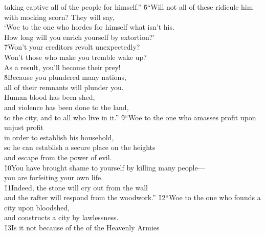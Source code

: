 \begin{poetry}
\poemll    taking captive all of the people for himself.''
\poeml \v{6}``Will not all of these ridicule him \\
\poemll    with mocking scorn? They will say, \\
\poeml `Woe to the one who hordes for himself what isn't his. \\
\poemll    How long will you enrich yourself by extortion?' \\
\poeml \v{7}Won't your creditors revolt unexpectedly? \\
\poemll    Won't those who make you tremble wake up? \\
\poemlll       As a result, you'll become their prey! \\
\poeml \v{8}Because you plundered many nations, \\
\poemll    all of their remnants will plunder you. \\
\poeml Human blood has been shed, \\
\poemll    and violence has been done to the land, \\
\poemlll       to the city, and to all who live in it.''
\poeml \v{9}``Woe to the one who amasses profit upon unjust profit \\
\poemll    in order to establish his household, \\
\poeml so he can establish a secure place on the heights \\
\poemll    and escape from the power of evil. \\
\poeml \v{10}You have brought shame to yourself by killing many people--- \\
\poemll    you are forfeiting your own life. \\
\poeml \v{11}Indeed, the stone will cry out from the wall \\
\poemll    and the rafter will respond from the woodwork.''
\poeml \v{12}``Woe to the one who founds a city upon bloodshed, \\
\poemll    and constructs a city by lawlessness. \\
\poeml \v{13}Is it not because of the  of the Heavenly Armies \\

\end{poetry}

